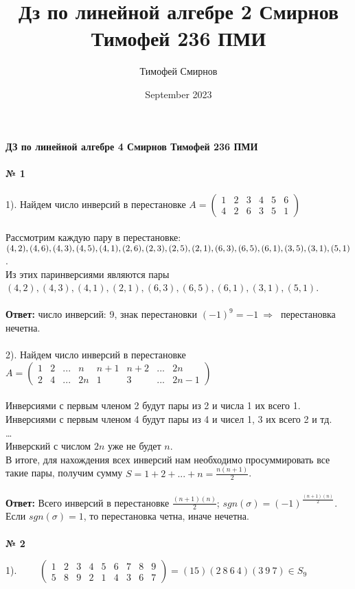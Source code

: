 \documentclass[a4paper, 12pt]{article}
\title{Дз по линейной алгебре 2 Смирнов Тимофей 236 ПМИ}
\author{Тимофей Смирнов}
\date{September 2023}
\begin{document}
    {\center \bf \large ДЗ по линейной алгебре 4 Смирнов Тимофей 236 ПМИ}
    \\\\ \textbf{№ 1}
    \\
    \\ 1). Найдем число инверсий в перестановке $A = \begin{pmatrix}1 & 2 & 3 & 4 & 5 & 6\\4 & 2 & 6 & 3 & 5 & 1\end{pmatrix}$
    \\\\ Рассмотрим каждую пару в перестановке: $(4, 2), (4, 6), (4, 3), (4, 5), (4, 1), (2, 6), (2, 3), (2, 5), (2, 1), (6, 3), \\(6, 5), (6, 1), (3, 5), (3, 1), (5, 1)$.
    \\ Из этих паринверсиями являются пары $(4, 2), (4, 3), (4, 1), (2, 1), (6, 3), (6, 5), (6, 1), (3, 1), (5, 1)$.
    \\\\ \textbf{Ответ: } число инверсий: 9, знак перестановки $(-1)^{9} = -1 \ \Rightarrow \ $ перестановка нечетна.
    \\
    \\ 2). Найдем число инверсий в перестановке $A = \begin{pmatrix}1 & 2 & ... & n & n + 1 & n + 2 & ... & 2n\\2 & 4 & ... & 2n & 1 & 3 & ... & 2n - 1\end{pmatrix}$
    \\\\ Инверсиями с первым членом 2 будут пары из 2 и числа {1} их всего 1.
    \\ Инверсиями с первым членом 4 будут пары из 4 и чисел {1, 3} их всего 2 и тд.
    \\ \dots
    \\ Инверский с числом $2n$ уже не будет $n$.
    \\ В итоге, для нахождения всех инверсий нам необходимо просуммировать все такие пары, получим сумму $S = 1 + 2 + ... + n= \frac{n(n + 1)}{2}$.
    \\
    \\ \textbf{Ответ: } Всего инверсий в перестановке $\frac{(n + 1)(n)}{2}$; $sgn(\sigma) = (-1)^{\frac{(n + 1)(n)}{2}}$. Если $sgn(\sigma) = 1$, то перестановка четна, иначе нечетна.
    \\
    \\ \textbf{№ 2}
    \\
    \par 1). \ \ \ \ $\begin{pmatrix}1 & 2 & 3 & 4 & 5 & 6 & 7 & 8 & 9\\ 5 & 8 & 9 & 2 & 1 & 4 & 3 & 6 & 7\end{pmatrix} = (1 5)(2 \ 8 \ 6 \ 4)(3 \ 9 \ 7) \in S_9$
\end{document}
